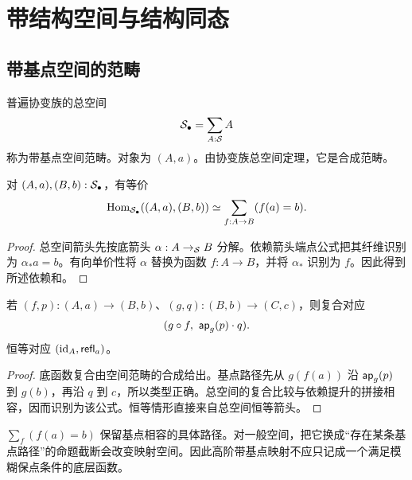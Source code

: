 \chapter{带结构空间与结构同态}
\section{带基点空间的范畴}
\begin{definition}[带基点空间范畴]
普遍协变族的总空间
\[
\mathcal S_\bullet=\sum_{A:\mathcal S}A
\]
称为带基点空间范畴。对象为 $(A,a)$。由协变族总空间定理，它是合成范畴。
\end{definition}
\begin{theorem}[带基点映射的公式]\label{thm:pointed-maps}
对 $(A,a),(B,b):\mathcal S_\bullet$，有等价
\[
\operatorname{Hom}_{\mathcal S_\bullet}((A,a),(B,b))
\simeq\sum_{f:A\to B}(f(a)=b).
\]
\end{theorem}
\begin{proof}
总空间箭头先按底箭头 $\alpha:A\to_\mathcal S B$ 分解。依赖箭头端点公式把其纤维识别为 $\alpha_*a=b$。有向单价性将 $\alpha$ 替换为函数 $f:A\to B$，并将 $\alpha_*$ 识别为 $f$。因此得到所述依赖和。
\end{proof}
\begin{proposition}[带基点映射的复合]
若 $(f,p):(A,a)\to(B,b)$、$(g,q):(B,b)\to(C,c)$，则复合对应
\[
(g\circ f,\ \mathsf{ap}_g(p)\cdot q).
\]
恒等对应 $(\operatorname{id}_A,\mathsf{refl}_a)$。
\end{proposition}
\begin{proof}
底函数复合由空间范畴的合成给出。基点路径先从 $g(f(a))$ 沿 $\mathsf{ap}_g(p)$ 到 $g(b)$，再沿 $q$ 到 $c$，所以类型正确。总空间的复合比较与依赖提升的拼接相容，因而识别为该公式。恒等情形直接来自总空间恒等箭头。
\end{proof}
\begin{remark}
$\sum_f(f(a)=b)$ 保留基点相容的具体路径。对一般空间，把它换成“存在某条基点路径”的命题截断会改变映射空间。因此高阶带基点映射不应只记成一个满足模糊保点条件的底层函数。
\end{remark}


